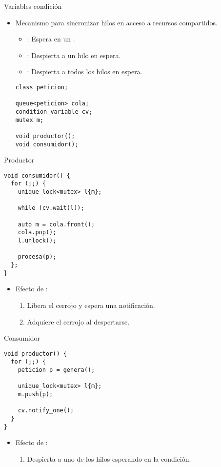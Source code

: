\begin{frame}[fragile]{Variables condición}
\begin{itemize}
  \item Mecanismo para sincronizar hilos en acceso a recursos compartidos.
    \begin{itemize}
      \item {}: Espera en un .
      \item {}: Despierta a un hilo en espera.
      \item {}: Despierta a todos los hilos en espera.
    \end{itemize}
\begin{lstlisting}
class peticion;

queue<peticion> cola;
condition_variable cv;
mutex m;

void productor();
void consumidor();
\end{lstlisting}
\end{itemize}
\end{frame}

\begin{frame}[fragile]{Productor}
\begin{lstlisting}
void consumidor() {
  for (;;) {
    unique_lock<mutex> l{m};

    while (cv.wait(l));

    auto m = cola.front();
    cola.pop();
    l.unlock();
   
    procesa(p);
  };
}
\end{lstlisting}
\begin{itemize}
  \item Efecto de :
    \begin{enumerate}
      \item Libera el cerrojo y espera una notificación.
      \item Adquiere el cerrojo al despertarse.
    \end{enumerate}
\end{itemize}
\end{frame}

\begin{frame}[fragile]{Consumidor}
\begin{lstlisting}
void productor() {
  for (;;) {
    peticion p = genera();

    unique_lock<mutex> l{m};
    m.push(p);

    cv.notify_one();
  }
}
\end{lstlisting}
\begin{itemize}
\item Efecto de :
  \begin{enumerate}
    \item Despierta a uno de los hilos esperando en la condición.
  \end{enumerate}
\end{itemize}
\end{frame}

